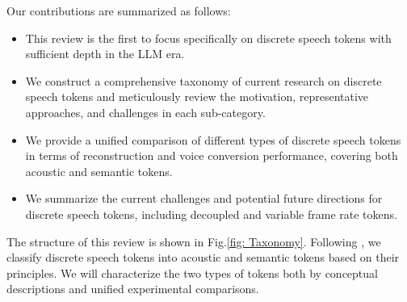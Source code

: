 Our contributions are summarized as follows:
\begin{itemize}
    \item This review is the first to focus specifically on discrete speech tokens with sufficient depth in the LLM era.
    \item We construct a comprehensive taxonomy of current research on discrete speech tokens and meticulously review the motivation, representative approaches, and challenges in each sub-category.
    \item We provide a unified comparison of different types of discrete speech tokens in terms of reconstruction and voice conversion performance, covering both acoustic and semantic tokens.
    \item We summarize the current challenges and potential future directions for discrete speech tokens, including decoupled and variable frame rate tokens.
\end{itemize}

The structure of this review is shown in Fig.\ref{fig: Taxonomy}.
Following \cite{borsos2023audiolm,kharitonov2023speak,yang2024towards}, we classify discrete speech tokens into acoustic and semantic tokens based on their principles.
We will characterize the two types of tokens both by conceptual descriptions and unified experimental comparisons.
